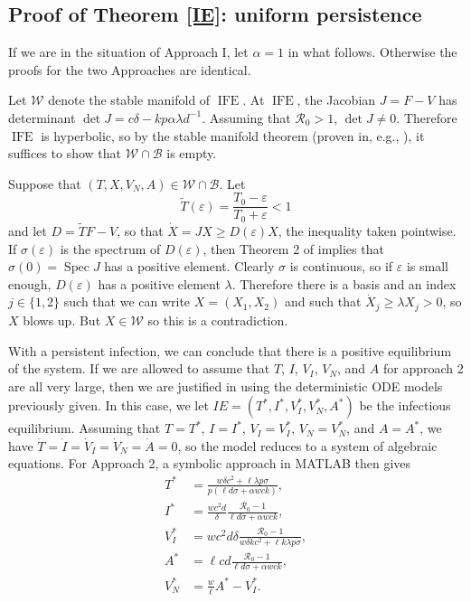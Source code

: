 \documentclass[]{elsarticle}
\newcommand{\BB}{\mathcal{B}}
\newcommand{\IFE}{\operatorname{IFE}}
\newcommand{\BRN}{\mathcal{R}_0}
\theoremstyle{definition}
\begin{document}
\begin{appendices}
\section{Proof of Theorem \ref{IE}: uniform persistence}

\label{pers}
    If we are in the situation of Approach I, let $\alpha = 1$ in what follows. Otherwise the proofs for the two Approaches are identical.

    Let $\mathcal W$ denote the stable manifold of $\IFE$. At $\IFE$, the Jacobian $J = F - V$ has determinant $\det J = c\delta - kp\alpha\lambda d^{-1}$. Assuming that $\BRN > 1$, $\det J \neq 0$. Therefore $\IFE$ is hyperbolic, so by the stable manifold theorem (proven in, e.g., \cite{dyatlov2018notes}), it suffices to show that $\mathcal W \cap \BB$ is empty.

    Suppose that $(T, X, V_N, A) \in \mathcal W \cap \BB$. Let
    $$\tilde T(\varepsilon) = \frac{T_0 - \varepsilon}{T_0 + \varepsilon} < 1$$ and let $D = \tilde TF - V$, so that $\dot X = JX \geq D(\varepsilon)X$, the inequality taken pointwise. If $\sigma(\varepsilon)$ is the spectrum of $D(\varepsilon)$, then Theorem 2 of \cite{van2002reproduction} implies that $\sigma(0) = \operatorname{Spec} J$ has a positive element. Clearly $\sigma$ is continuous, so if $\varepsilon$ is small enough, $D(\varepsilon)$ has a positive element $\lambda$. Therefore there is a basis and an index $j \in \{1, 2\}$ such that we can write $X = (X_1, X_2)$ and such that $\dot X_j \geq \lambda X_j > 0$, so $X$ blows up. But $X \in \mathcal W$ so this is a contradiction.



With a persistent infection, we can conclude that there is a positive equilibrium of the system. If we are allowed to assume that $T$, $I$, $V_I$, $V_N$, and $A$ for approach 2 are all very large, then we are justified in using the deterministic ODE models previously given. In this case, we let $IE = (T^*, I^*, V_I^*, V_N^*, A^*)$ be the infectious equilibrium. Assuming that $T = T^*$, $I = I^*$, $V_I = V_I^*$, $V_N = V_N^*$, and $A = A^*$, we have $\dot T = \dot I = \dot V_I = \dot V_N = \dot A = 0$, so the model reduces to a system of algebraic equations. For Approach 2, a symbolic approach in MATLAB then gives
\begin{align*}
    T^* &= \frac{w\delta c^2+\ell\lambda p\sigma}{p(\ell d\sigma+\alpha wck)},\\
    I^* &= \frac{wc^2 d}{\delta} \frac{\BRN - 1}{\ell d\sigma + \alpha wck},\\
    V_I^* &= wc^2d\delta\frac{\BRN - 1}{w\delta kc^2 + \ell k\lambda p\sigma},\\
    A^* &= \ell cd \frac{\BRN - 1}{\ell d \sigma + \alpha wck},\\
    V_N^* &= \frac{w}{\ell}A^* - V_I^*.
\end{align*}




\end{appendices}
\end{document}
